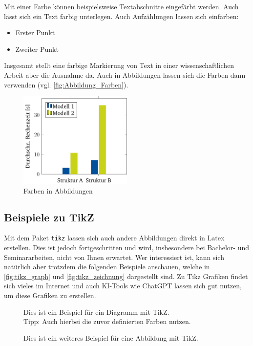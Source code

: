 Mit einer Farbe können beispielsweise \textcolor{luhblau}{Textabschnitte eingefärbt} werden. Auch lässt sich ein Text \colorbox{luhgruen}{farbig unterlegen}. Auch Aufzählungen lassen sich einfärben:
\begin{itemize}
    \color{luhmittelblau}
    \item Erster Punkt
    \item Zweiter Punkt
\end{itemize}

Insgesamt stellt eine farbige Markierung von Text in einer wissenschaftlichen Arbeit aber die Ausnahme da. Auch in Abbildungen lassen sich die Farben dann verwenden (vgl. \autoref{fig:Abbildung_Farben}).

\begin{figure}[H]
    \centering
    \includegraphics[width=0.5\textwidth]{Abbildungen/Bsp_Abb_Farben_1.pdf}
    \caption{Farben in Abbildungen}
    \label{fig:Abbildung_Farben}
\end{figure}

\subsection{Beispiele zu TikZ}

Mit dem Paket \texttt{tikz} lassen sich auch andere Abbildungen direkt in Latex erstellen. Dies ist jedoch fortgeschritten und wird, insbesondere bei Bachelor- und Seminararbeiten, nicht von Ihnen erwartet. Wer interessiert ist, kann sich natürlich aber trotzdem die folgenden Beispiele anschauen, welche in \autoref{fig:tikz_graph} und \autoref{fig:tikz_zeichnung} dargestellt sind. Zu Tikz Grafiken findet sich vieles im Internet und auch KI-Tools wie ChatGPT lassen sich gut nutzen, um diese Grafiken zu erstellen.


\begin{figure}[H]
    \centering
    
    \caption[Dies ist ein Beispiel für eine Abbildung mit TikZ.]{{Dies ist ein Beispiel für ein Diagramm mit TikZ.\\{\small Tipp: Auch hierbei die zuvor definierten Farben nutzen.}}}
    \label{fig:tikz_graph}
\end{figure}



\begin{figure}[H]
    \centering
    
    \caption{Dies ist ein weiteres Beispiel für eine Abbildung mit TikZ.}
    \label{fig:tikz_zeichnung}
\end{figure}


